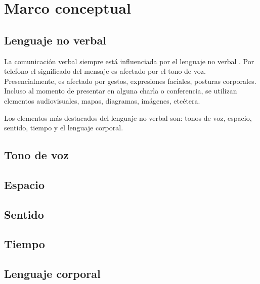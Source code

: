 \chapter{Marco conceptual}

\section{Lenguaje no verbal}
La comunicación verbal siempre está influenciada por el lenguaje no verbal \cite{bussinessCommunication}. Por telefono el significado del mensaje es afectado por el tono de voz. Presencialmente, es afectado por gestos, expresiones faciales, posturas corporales. Incluso al momento de presentar en alguna charla o conferencia, se utilizan elementos audiovisuales, mapas, diagramas, imágenes, etcétera.

Los elementos más destacados del lenguaje no verbal son: tonos de voz, espacio, sentido, tiempo y el lenguaje corporal.

\section{Tono de voz}
\section{Espacio}
\section{Sentido}
\section{Tiempo}

\section{Lenguaje corporal}

